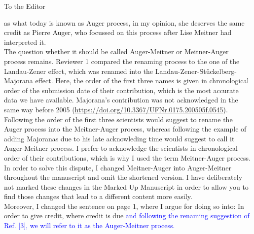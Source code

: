 \documentclass[DIN,pagenumber=false,parskip=half,fromalign=left,fromphone=false,fromemail=true,fromurl=false,fromlogo=false,fromrule=false]{scrlttr2}
\begin{document}
\begin{letter}{To the Editor}
\begin{itemize}
       as what today is known as Auger process, in my opinion,
       she deserves the same credit as
       Pierre Auger, who focussed on this process after Lise Meitner had interpreted it.\\
       The question whether it should be called Auger-Meitner or Meitner-Auger process
       remains. Reviewer 1 compared the renaming process to the one of the 
       Landau-Zener effect, which was renamed into the
       Landau-Zener-Stückelberg-Majorana effect. Here, the order of the first three
       names is given in chronological order of the submission date of their contribution,
       which is the most accurate data we have available.
       Majorana's contribution was not acknowledged in the same way before 2005
       (\url{https://doi.org/10.3367/UFNr.0175.200505f.0545}). Following the order of the
       first three scientists would suggest to rename the Auger process into the
       Meitner-Auger process, whereas following the example of adding Majoranas due to his
       late acknowleding time would suggest to call it Auger-Meitner process.
       I prefer to acknowledge the scientists in chronological order of their
       contributions, which is why
       I used the term Meitner-Auger process.\\
       {In order to solve this dispute,
       I changed Meitner-Auger into Auger-Meitner throughout the manuscript
       and omit the shortened version.} I have deliberately not marked these changes in
       the Marked Up Manuscript in order to allow you to find those changes that
       lead to a different content more easily.\\
       Moreover, I changed the sentence on page 1, where I
       argue for doing so into:
       In order to give credit, where credit is due
       \textcolor{blue}
       {and following the renaming suggestion of Ref. [3],
       we will refer to it as the Auger-Meitner process.}
       
\end{itemize}


\end{letter}
\end{document}
